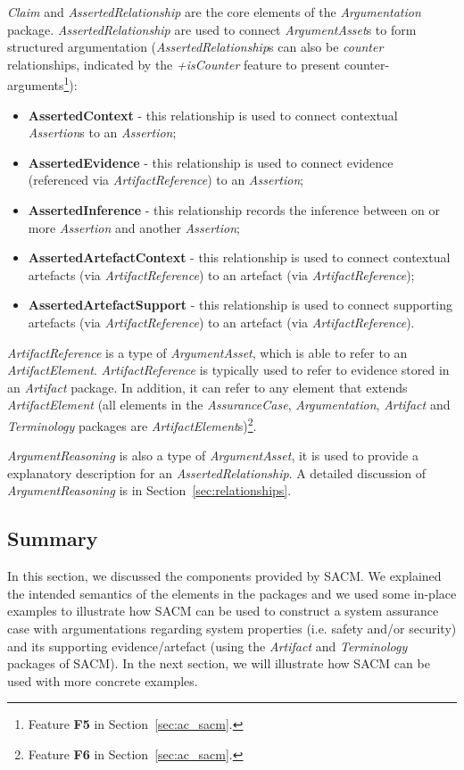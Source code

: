 \textit{Claim} and \textit{AssertedRelationship} are the core elements of the \textit{Argumentation} package.
\textit{AssertedRelationship} are used to connect \textit{ArgumentAsset}s to form structured argumentation (\textit{AssertedRelationship}s can also be \textit{counter} relationships, indicated by the \textit{+isCounter} feature to present counter-arguments\footnote{Feature \textbf{F5} in Section~\ref{sec:ac_sacm}.}):

\begin{itemize}
	\item \textbf{AssertedContext} - this relationship is used to connect contextual \textit{Assertion}s to an \textit{Assertion};
	\item \textbf{AssertedEvidence} - this relationship is used to connect evidence (referenced via \textit{ArtifactReference}) to an \textit{Assertion};
	\item \textbf{AssertedInference} - this relationship records the inference between on or more \textit{Assertion} and another \textit{Assertion};
	\item \textbf{AssertedArtefactContext} - this relationship is used to connect contextual artefacts (via \textit{ArtifactReference}) to an artefact (via \textit{ArtifactReference});
	\item \textbf{AssertedArtefactSupport} - this relationship is used to connect supporting artefacts (via \textit{ArtifactReference}) to an artefact (via \textit{ArtifactReference}).
\end{itemize}

\textit{ArtifactReference} is a type of \textit{ArgumentAsset}, which is able to refer to an \textit{ArtifactElement}.
\textit{ArtifactReference} is typically used to refer to evidence stored in an \textit{Artifact} package. 
In addition, it can refer to any element that extends \textit{ArtifactElement} (all elements in the \textit{AssuranceCase}, \textit{Argumentation}, \textit{Artifact} and \textit{Terminology} packages are \textit{ArtifactElement}s)\footnote{Feature \textbf{F6} in Section~\ref{sec:ac_sacm}.}. 

\textit{ArgumentReasoning} is also a type of \textit{ArgumentAsset}, it is used to provide a explanatory description for an \textit{AssertedRelationship}. 
A detailed discussion of \textit{ArgumentReasoning} is in Section~\ref{sec:relationships}.

\subsection{Summary}
In this section, we discussed the components provided by SACM. We explained the intended semantics of the elements in the packages and we used some in-place examples to illustrate how SACM can be used to construct a system assurance case with argumentations regarding system properties (i.e. safety and/or security) and its supporting evidence/artefact (using the \textit{Artifact} and \textit{Terminology} packages of SACM). 
In the next section, we will illustrate how SACM can be used with more concrete examples.

